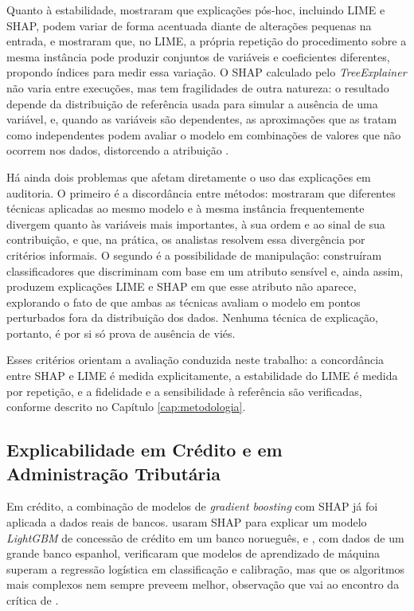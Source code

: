 Quanto à estabilidade,  mostraram que explicações pós-hoc, incluindo LIME e SHAP, podem variar de forma acentuada diante de alterações pequenas na entrada, e  mostraram que, no LIME, a própria repetição do procedimento sobre a mesma instância pode produzir conjuntos de variáveis e coeficientes diferentes, propondo índices para medir essa variação. O SHAP calculado pelo \textit{TreeExplainer} não varia entre execuções, mas tem fragilidades de outra natureza: o resultado depende da distribuição de referência usada para simular a ausência de uma variável, e, quando as variáveis são dependentes, as aproximações que as tratam como independentes podem avaliar o modelo em combinações de valores que não ocorrem nos dados, distorcendo a atribuição \cite{kumarProblemsShapleyvalueBased2020, aasExplainingIndividualPredictions2021}.

Há ainda dois problemas que afetam diretamente o uso das explicações em auditoria. O primeiro é a discordância entre métodos:  mostraram que diferentes técnicas aplicadas ao mesmo modelo e à mesma instância frequentemente divergem quanto às variáveis mais importantes, à sua ordem e ao sinal de sua contribuição, e que, na prática, os analistas resolvem essa divergência por critérios informais. O segundo é a possibilidade de manipulação:  construíram classificadores que discriminam com base em um atributo sensível e, ainda assim, produzem explicações LIME e SHAP em que esse atributo não aparece, explorando o fato de que ambas as técnicas avaliam o modelo em pontos perturbados fora da distribuição dos dados. Nenhuma técnica de explicação, portanto, é por si só prova de ausência de viés.

Esses critérios orientam a avaliação conduzida neste trabalho: a concordância entre SHAP e LIME é medida explicitamente, a estabilidade do LIME é medida por repetição, e a fidelidade e a sensibilidade à referência são verificadas, conforme descrito no Capítulo \ref{cap:metodologia}.

\subsection{Explicabilidade em Crédito e em Administração Tributária}
\label{subsec:xai_tributacao}

Em crédito, a combinação de modelos de \textit{gradient boosting} com SHAP já foi aplicada a dados reais de bancos.  usaram SHAP para explicar um modelo \textit{LightGBM} de concessão de crédito em um banco norueguês, e , com dados de um grande banco espanhol, verificaram que modelos de aprendizado de máquina superam a regressão logística em classificação e calibração, mas que os algoritmos mais complexos nem sempre preveem melhor, observação que vai ao encontro da crítica de .

